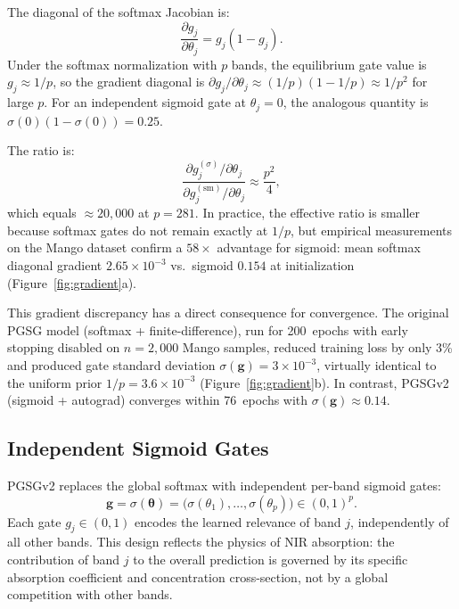 \documentclass[preprint,12pt,hidelinks]{elsarticle}
\begin{document}
The diagonal of the softmax Jacobian is:
\begin{equation}
  \frac{\partial g_j}{\partial \theta_j}
  = g_j(1 - g_j).
  \label{eq:softmax_grad}
\end{equation}
Under the softmax normalization with $p$ bands, the equilibrium gate value
is $g_j \approx 1/p$, so the gradient diagonal is
$\partial g_j/\partial\theta_j \approx (1/p)(1 - 1/p) \approx 1/p^2$ for
large $p$. For an independent sigmoid gate at $\theta_j = 0$,
the analogous quantity is $\sigma(0)(1-\sigma(0)) = 0.25$.

The ratio is:
\begin{equation}
  \frac{\partial g_j^{(\sigma)}/\partial\theta_j}
       {\partial g_j^{(\mathrm{sm})}/\partial\theta_j}
  \approx \frac{p^2}{4},
  \label{eq:ratio}
\end{equation}
which equals $\approx 20{,}000$ at $p = 281$. In practice, the effective
ratio is smaller because softmax gates do not remain exactly at $1/p$, but
empirical measurements on the Mango dataset confirm a $58\times$ advantage
for sigmoid: mean softmax diagonal gradient $2.65 \times 10^{-3}$ vs.\
sigmoid $0.154$ at initialization (Figure~\ref{fig:gradient}a).

This gradient discrepancy has a direct consequence for convergence. The
original PGSG model (softmax + finite-difference), run for 200~epochs with
early stopping disabled on $n = 2{,}000$ Mango samples, reduced training
loss by only 3\% and produced gate standard deviation $\sigma(\mathbf{g})
= 3 \times 10^{-3}$, virtually identical to the uniform prior $1/p = 3.6
\times 10^{-3}$ (Figure~\ref{fig:gradient}b). In contrast, PGSGv2
(sigmoid + autograd) converges within 76~epochs with
$\sigma(\mathbf{g}) \approx 0.14$.

\subsection{Independent Sigmoid Gates}

PGSGv2 replaces the global softmax with independent per-band sigmoid gates:
\begin{equation}
  \mathbf{g} = \sigma(\boldsymbol{\theta})
  = \bigl(\sigma(\theta_1), \ldots, \sigma(\theta_p)\bigr)
  \in (0, 1)^p.
  \label{eq:sigmoid_gate}
\end{equation}
Each gate $g_j \in (0,1)$ encodes the learned relevance of band $j$,
independently of all other bands. This design reflects the physics of NIR
absorption: the contribution of band $j$ to the overall prediction is
governed by its specific absorption coefficient and concentration
cross-section, not by a global competition with other bands.
\end{document}
